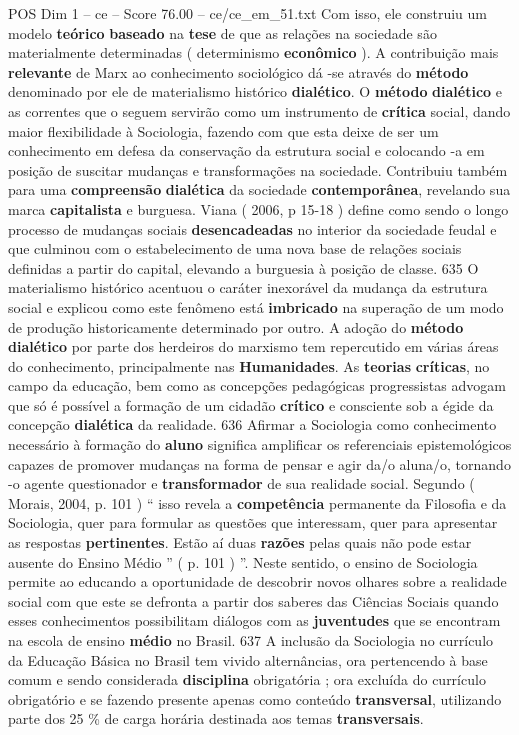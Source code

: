 \begin{textsample}{POS Dim 1 – ce – Score 76.00 – ce/ce\_em\_51.txt}
Com isso, ele construiu um modelo \textbf{teórico} \textbf{baseado} na \textbf{tese} de que as relações na sociedade são materialmente determinadas ( determinismo \textbf{econômico} ).
A contribuição mais \textbf{relevante} de Marx ao conhecimento sociológico dá -se através do \textbf{método} denominado por ele de materialismo histórico \textbf{dialético}.
O \textbf{método} \textbf{dialético} e as correntes que o seguem servirão como um instrumento de \textbf{crítica} social, dando maior flexibilidade à Sociologia, fazendo com que esta deixe de ser um conhecimento em defesa da conservação da estrutura social e colocando -a em posição de suscitar mudanças e transformações na sociedade.
Contribuiu também para uma \textbf{compreensão} \textbf{dialética} da sociedade \textbf{contemporânea}, revelando sua marca \textbf{capitalista} e burguesa.
Viana ( 2006, p 15-18 ) define como sendo o longo processo de mudanças sociais \textbf{desencadeadas} no interior da sociedade feudal e que culminou com o estabelecimento de uma nova base de relações sociais definidas a partir do capital, elevando a burguesia à posição de classe. 635 O materialismo histórico acentuou o caráter inexorável da mudança da estrutura social e explicou como este fenômeno está \textbf{imbricado} na superação de um modo de produção historicamente determinado por outro.
A adoção do \textbf{método} \textbf{dialético} por parte dos herdeiros do marxismo tem repercutido em várias áreas do conhecimento, principalmente nas \textbf{Humanidades}.
As \textbf{teorias} \textbf{críticas}, no campo da educação, bem como as concepções pedagógicas progressistas advogam que só é possível a formação de um cidadão \textbf{crítico} e consciente sob a égide da concepção \textbf{dialética} da realidade. 636 Afirmar a Sociologia como conhecimento necessário à formação do \textbf{aluno} significa amplificar os referenciais epistemológicos capazes de promover mudanças na forma de pensar e agir da/o aluna/o, tornando -o agente questionador e \textbf{transformador} de sua realidade social.
Segundo ( Morais, 2004, p. 101 ) “ isso revela a \textbf{competência} permanente da Filosofia e da Sociologia, quer para formular as questões que interessam, quer para apresentar as respostas \textbf{pertinentes}.
Estão aí duas \textbf{razões} pelas quais não pode estar ausente do Ensino Médio ” ( p. 101 ) ”.
Neste sentido, o ensino de Sociologia permite ao educando a oportunidade de descobrir novos olhares sobre a realidade social com que este se defronta a partir dos saberes das Ciências Sociais quando esses conhecimentos possibilitam diálogos com as \textbf{juventudes} que se encontram na escola de ensino \textbf{médio} no Brasil. 637 A inclusão da Sociologia no currículo da Educação Básica no Brasil tem vivido alternâncias, ora pertencendo à base comum e sendo considerada \textbf{disciplina} obrigatória ; ora excluída do currículo obrigatório e se fazendo presente apenas como conteúdo \textbf{transversal}, utilizando parte dos 25 \% de carga horária destinada aos temas \textbf{transversais}.

\end{textsample}
